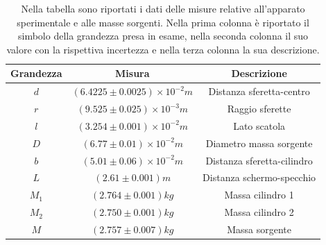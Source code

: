 \documentclass{article}
\begin{document}
\begin{table}[ht!]
    \centering
    \begin{tabular}{|c|c|c|}
    \hline
        Grandezza & Misura & Descrizione\\
        \hline
        $d$	&$(6.4225 \pm 0.0025)\times10^{-2} m$&Distanza sferetta-centro\\
        \hline
        $r$  &$(9.525 \pm 0.025)\times10^{-3}m$&Raggio sferette\\
        \hline
        $l$  &$(3.254 \pm 0.001)\times10^{-2} m$&Lato scatola\\
        \hline
        $D$ &$(6.77 \pm 0.01)\times10^{-2} m$&Diametro massa sorgente\\
        \hline
        $b$ &$(5.01 \pm 0.06)\times10^{-2} m$&Distanza sferetta-cilindro\\
        \hline
        $L$ &$(2.61 \pm 0.001) m$&Distanza schermo-specchio\\
        \hline
        $M_1$ &$(2.764 \pm 0.001) kg$&Massa cilindro 1\\
        \hline
        $M_2$ &$(2.750 \pm 0.001) kg$&Massa cilindro 2\\
        \hline
        $M$ & $(2.757 \pm 0.007) kg$ & Massa sorgente\\
        \hline
    \end{tabular}
    \caption{Nella tabella sono riportati i dati delle misure relative all'apparato sperimentale e alle masse sorgenti. Nella prima colonna è riportato il simbolo della grandezza presa in esame, nella seconda colonna il suo valore con la rispettiva incertezza e nella terza colonna la sua descrizione.}
    \label{tab:daq}
\end{table}
\end{document}
